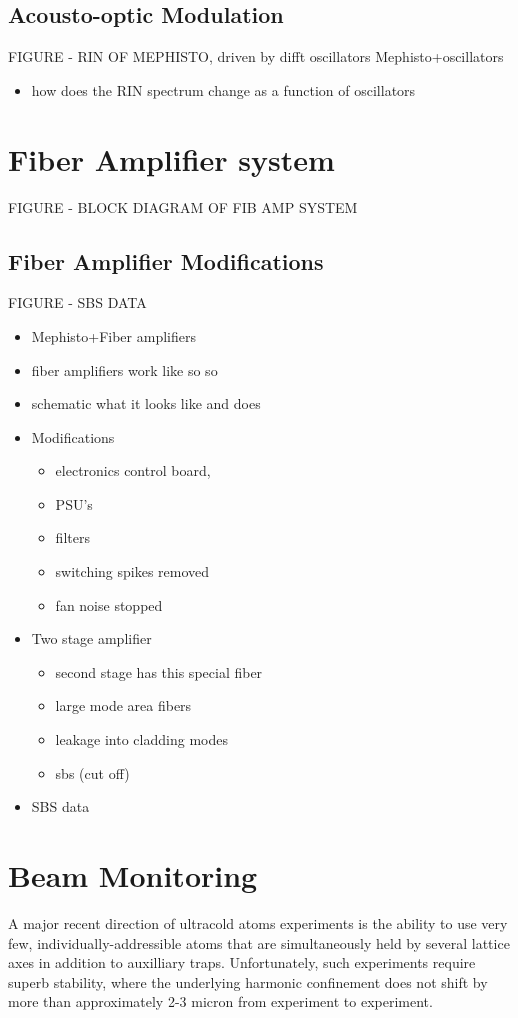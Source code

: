 \documentclass[twocolumn,aps,pra,showpacs,preprintnumbers,bibnotes]{revtex4-1}
\begin{document}
\subsection{Acousto-optic Modulation}

FIGURE - RIN OF MEPHISTO, driven by difft oscillators
Mephisto+oscillators
\begin{itemize}
	\item how does the RIN spectrum change as a function of oscillators
\end{itemize}
\section{Fiber Amplifier system}
FIGURE - BLOCK DIAGRAM OF FIB AMP SYSTEM

\subsection{Fiber Amplifier Modifications}
FIGURE - SBS DATA
\begin{itemize}
	\item Mephisto+Fiber amplifiers
\item fiber amplifiers work like so so
\item schematic what it looks like and does
\item Modifications
	\begin{itemize}
		\item electronics control board,
		\item PSU's
		\item filters
		\item switching spikes removed
		\item fan noise stopped
	\end{itemize}
\item Two stage amplifier
	\begin{itemize}
		\item second stage has this special fiber 
		\item large mode area fibers
		\item leakage into cladding modes 
		\item sbs (cut off)
	\end{itemize}
\item SBS data
\end{itemize}
\section{Beam Monitoring}
A major recent direction of ultracold atoms experiments is the ability to use very few, individually-addressible atoms\cite{AFM paper, quantum walks few body} that are simultaneously held by several lattice axes in addition to auxilliary traps.
Unfortunately, such experiments require superb stability, where the underlying harmonic confinement does not shift by more than approximately 2-3 micron from experiment to experiment. 
\end{document}
